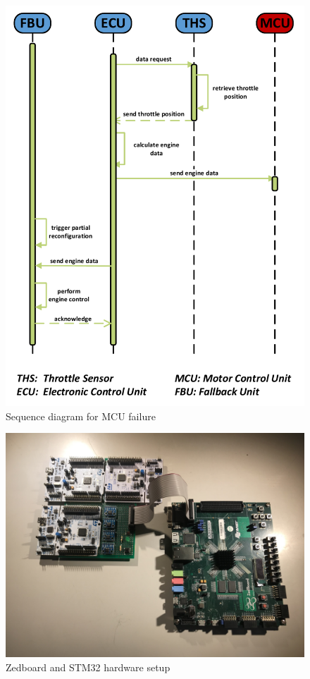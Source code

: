 \begin{figure}[h!]
    \centering
    \includegraphics[width=\textwidth]{figures/sequence_mcu_fail.pdf}
    \caption{Sequence diagram for \gls{MCU} failure}\label{fig:sequenceMCUFailure}
\end{figure}

\begin{figure}
    \centering
    \includegraphics[width=\textwidth]{figures/hw_setup.jpg}
    \caption{Zedboard and STM32 hardware setup}\label{fig:setup}
\end{figure}

